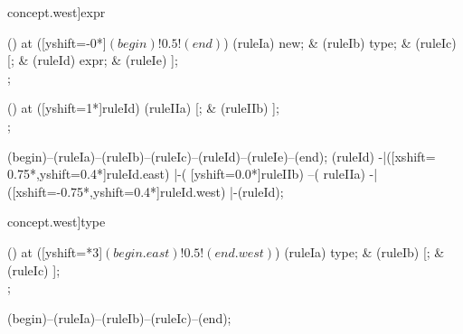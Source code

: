 \begin{syntax}[[xshift=22mm]concept.west]{expr}
  
  \node[sequence,column sep=1.5cm] () at ([yshift=-0*\syntaxruledist]$(begin)!0.5!(end)$) {
    \node[terminal]       (ruleIa) {new};
    &
    \node[nonterminal]    (ruleIb) {type};
    &
    \node[terminal]       (ruleIc) {[};
    &
    \node[nonterminal]    (ruleId) {expr};
    &
    \node[terminal]       (ruleIe) {]};
    \\
  };
  
  \node[sequence,column sep=1.0cm] () at ([yshift=1*\syntaxruledist]ruleId) {
    \node[terminal]    (ruleIIa) {[};
    &
    \node[terminal]    (ruleIIb) {]};
    \\
  };
  
  \draw[path] (begin)--(ruleIa)--(ruleIb)--(ruleIc)--(ruleId)--(ruleIe)--(end);
  \draw[path] (ruleId)
            -|([xshift= 0.75*\syntaxruledist,yshift=0.4*\syntaxruledist]ruleId.east)
            |-(                            [yshift=0.0*\syntaxruledist]ruleIIb)
            --(                                                        ruleIIa)
            -|([xshift=-0.75*\syntaxruledist,yshift=0.4*\syntaxruledist]ruleId.west)
            |-(ruleId);
\end{syntax}

\begin{syntax}[[xshift=22mm]concept.west]{type}
  
  \node[sequence,anchor=north,column sep=1.5cm] () at ([yshift=\syntaxrulenodeheight-0.8pt*3]$(begin.east)!0.5!(end.west)$) {
    \node[nonterminal] (ruleIa) {type};
    &
    \node[terminal]    (ruleIb) {[};
    &
    \node[terminal]    (ruleIc) {]};
    \\
  };
  
  \draw[path] (begin)--(ruleIa)--(ruleIb)--(ruleIc)--(end);
\end{syntax}

